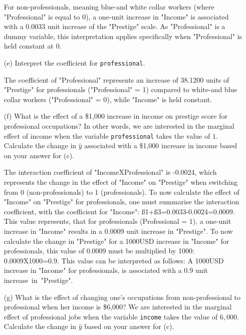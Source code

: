 \documentclass[12pt,letterpaper]{article}
\begin{document}
\begin{enumerate}
	For non-professionals, meaning blue-and white collar workers (where "Professional" is equal to 0), a one-unit increase in "Income" is associated with a 0.0033 unit increase of the "Prestige" scale. As "Professional" is a dummy variable, this interpretation applies specifically when "Professional" is held constant at 0.  
	\vspace{10cm}	
	\item [(e)]
	Interpret the coefficient for \texttt{professional}.

	The coefficient of "Professional" represents an increase of 38.1200 units of "Prestige" for professionals ("Professional" = 1) compared to white-and blue collar workers ("Professional" = 0), while "Income" is held constant. 
	\newpage
	\item [(f)]
	What is the effect of a \$1,000 increase in income on prestige score for professional occupations? In other words, we are interested in the marginal effect of income when the variable \texttt{professional} takes the value of $1$. Calculate the change in $\hat{y}$ associated with a \$1,000 increase in income based on your answer for (c).

	
The interaction coefficient of "IncomeXProfessional" is -0.0024, which represents the change in the effect of "Income" on "Prestige" when switching from 0 (non-professionals) to 1 (professionals). To now calculate the effect of "Income" on "Prestige" for professionals, one must summarise the interaction coefficient, with the coefficient for "Income": ß1+ß3=0.0033-0.0024=0.0009. This value represents, that for professionals (Professional = 1), a one-unit increase in "Income" results in a 0.0009 unit increase in "Prestige". To now calculate the change in "Prestige" for a 1000USD increase in "Income" for professionals, this value of 0.0009 must be multiplied by 1000: 0.0009X1000=0.9. 
This value can be interpreted as follows: A 1000USD increase in "Income" for professionals, is associated with a 0.9 unit increase in "Prestige".
	\vspace{10cm}
	
	
	\item [(g)]
	What is the effect of changing one's occupations from non-professional to professional when her income is \$6,000? We are interested in the marginal effect of professional jobs when the variable \texttt{income} takes the value of $6,000$. Calculate the change in $\hat{y}$ based on your answer for (c).


\end{enumerate}
\end{document}
